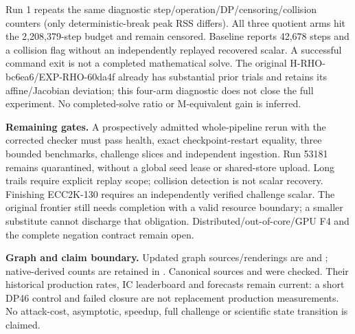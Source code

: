\documentclass[10pt]{article}
\begin{document}
Run 1 repeats the same diagnostic step/operation/DP/censoring/collision counters
(only deterministic-break peak RSS differs). All three quotient arms hit the
2,208,379-step budget and remain censored. Baseline reports 42,678 steps and
a collision flag without an independently replayed recovered scalar.
A successful command exit is not a completed mathematical solve. The original
H-RHO-bc6ea6/EXP-RHO-60da4f already has substantial prior trials and retains
its affine/Jacobian deviation; this four-arm diagnostic does not close the
full experiment. No completed-solve ratio or M-equivalent gain is inferred.

\textbf{Remaining gates.} A prospectively admitted whole-pipeline rerun with
the corrected checker must pass health, exact checkpoint-restart equality,
three bounded benchmarks, challenge slices and independent ingestion.
Run 53181 remains quarantined, without a global seed lease or shared-store
upload. Long trails require explicit replay scope; collision detection is
not scalar recovery. Finishing ECC2K-130 requires an independently verified
challenge scalar. The original frontier still needs completion with a valid
resource boundary; a smaller substitute cannot discharge that obligation.
Distributed/out-of-core/GPU F4 and the complete negation contract remain open.

\textbf{Graph and claim boundary.} Updated graph sources/renderings are
 and ; native-derived
counts are retained in . Canonical sources
 and
 were checked. Their historical production rates,
IC leaderboard and forecasts remain current: a short DP46 control and failed
closure are not replacement production measurements. No attack-cost,
asymptotic, speedup, full challenge or scientific state transition is claimed.
\end{document}
